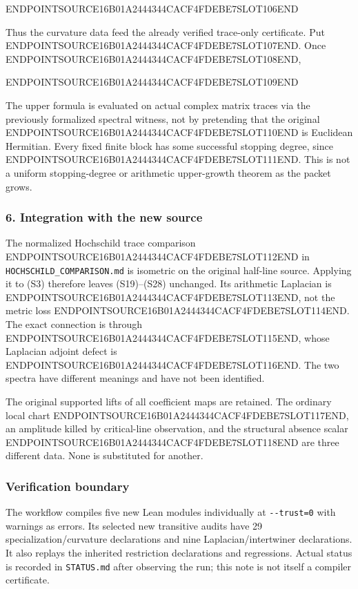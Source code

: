 ENDPOINTSOURCE16B01A2444344CACF4FDEBE7SLOT106END

Thus the curvature data feed the already verified trace-only certificate. Put ENDPOINTSOURCE16B01A2444344CACF4FDEBE7SLOT107END. Once ENDPOINTSOURCE16B01A2444344CACF4FDEBE7SLOT108END,

ENDPOINTSOURCE16B01A2444344CACF4FDEBE7SLOT109END

The upper formula is evaluated on actual complex matrix traces via the previously formalized spectral witness, not by pretending that the original ENDPOINTSOURCE16B01A2444344CACF4FDEBE7SLOT110END is Euclidean Hermitian. Every fixed finite block has some successful stopping degree, since ENDPOINTSOURCE16B01A2444344CACF4FDEBE7SLOT111END. This is not a uniform stopping-degree or arithmetic upper-growth theorem as the packet grows.

\subsubsection{6. Integration with the new source}\label{endpoint-cc_specialization--integration-with-the-new-source}

The normalized Hochschild trace comparison ENDPOINTSOURCE16B01A2444344CACF4FDEBE7SLOT112END in \texttt{HOCHSCHILD\_COMPARISON.md} is isometric on the original half-line source. Applying it to (S3) therefore leaves (S19)--(S28) unchanged. Its arithmetic Laplacian is ENDPOINTSOURCE16B01A2444344CACF4FDEBE7SLOT113END, not the metric loss ENDPOINTSOURCE16B01A2444344CACF4FDEBE7SLOT114END. The exact connection is through ENDPOINTSOURCE16B01A2444344CACF4FDEBE7SLOT115END, whose Laplacian adjoint defect is ENDPOINTSOURCE16B01A2444344CACF4FDEBE7SLOT116END. The two spectra have different meanings and have not been identified.

The original supported lifts of all coefficient maps are retained. The ordinary local chart ENDPOINTSOURCE16B01A2444344CACF4FDEBE7SLOT117END, an amplitude killed by critical-line observation, and the structural absence scalar ENDPOINTSOURCE16B01A2444344CACF4FDEBE7SLOT118END are three different data. None is substituted for another.

\subsubsection{Verification boundary}\label{endpoint-cc_specialization--verification-boundary}

The workflow compiles five new Lean modules individually at \texttt{-\/-trust=0} with warnings as errors. Its selected new transitive audits have 29 specialization/curvature declarations and nine Laplacian/intertwiner declarations. It also replays the inherited restriction declarations and regressions. Actual status is recorded in \texttt{STATUS.md} after observing the run; this note is not itself a compiler certificate.

